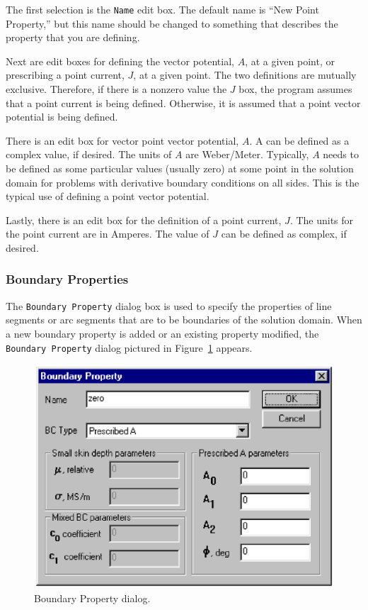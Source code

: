 \documentclass[12pt]{report}
\begin{document}
The first selection is the {\tt Name} edit box.  The default name
is ``New Point Property,'' but this name should be changed to
something that describes the property that you are defining.

Next are edit boxes for defining the vector potential, $A$, at a
given point, or prescribing a point current, $J$, at a given point.
The two definitions are mutually exclusive.  Therefore, if there
is a nonzero value the $J$ box, the program assumes
that a point current is being defined.  Otherwise, it is assumed
that a point vector potential is being defined.

There is an edit box for vector point vector potential, $A$.  A
can be defined as a complex value, if desired. The units of
$A$ are Weber/Meter.  Typically, $A$ needs to be
defined as some particular values (usually zero) at some point in
the solution domain for problems with derivative boundary
conditions on all sides.  This is the typical use of defining a
point vector potential.

Lastly, there is an edit box for the definition of a point
current, $J$.  The units for the point current are
in Amperes.  The value of $J$ can be defined as complex, if desired.

\subsubsection{Boundary Properties}

The {\tt Boundary Property} dialog box is used to specify the
properties of line segments or arc segments that are to be
boundaries of the solution domain.  When a new boundary property is
added or an existing property modified, the {\tt Boundary Property}
dialog pictured in Figure~\ref{boundaryprop} appears.
\begin{figure}[ht]
\centerline{\includegraphics{bdryprop.ps}}
\caption{Boundary Property dialog.}
\label{boundaryprop}
\end{figure}
\end{document}
